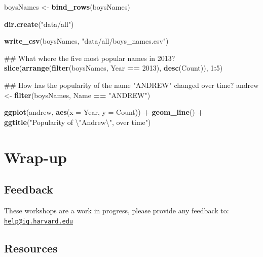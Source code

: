 \documentclass[]{book}
\newenvironment{Shaded}{\begin{snugshade}}{\end{snugshade}}
\newcommand{\KeywordTok}[1]{\textcolor[rgb]{0.13,0.29,0.53}{\textbf{#1}}}
\newcommand{\DataTypeTok}[1]{\textcolor[rgb]{0.13,0.29,0.53}{#1}}
\newcommand{\DecValTok}[1]{\textcolor[rgb]{0.00,0.00,0.81}{#1}}
\newcommand{\CharTok}[1]{\textcolor[rgb]{0.31,0.60,0.02}{#1}}
\newcommand{\StringTok}[1]{\textcolor[rgb]{0.31,0.60,0.02}{#1}}
\newcommand{\OperatorTok}[1]{\textcolor[rgb]{0.81,0.36,0.00}{\textbf{#1}}}
\newcommand{\NormalTok}[1]{#1}
\begin{document}
\begin{Shaded}
\begin{Highlighting}[]
\NormalTok{boysNames <-}\StringTok{ }\KeywordTok{bind_rows}\NormalTok{(boysNames)}

\KeywordTok{dir.create}\NormalTok{(}\StringTok{"data/all"}\NormalTok{)}

\KeywordTok{write_csv}\NormalTok{(boysNames, }\StringTok{"data/all/boys_names.csv"}\NormalTok{)}

\NormalTok{## What where the five most popular names in 2013?}
\KeywordTok{slice}\NormalTok{(}\KeywordTok{arrange}\NormalTok{(}\KeywordTok{filter}\NormalTok{(boysNames, Year }\OperatorTok{==}\StringTok{ }\DecValTok{2013}\NormalTok{),}
              \KeywordTok{desc}\NormalTok{(Count)),}
      \DecValTok{1}\OperatorTok{:}\DecValTok{5}\NormalTok{)}

\NormalTok{## How has the popularity of the name "ANDREW" changed over time?}
\NormalTok{andrew <-}\StringTok{ }\KeywordTok{filter}\NormalTok{(boysNames, Name }\OperatorTok{==}\StringTok{ "ANDREW"}\NormalTok{)}

\KeywordTok{ggplot}\NormalTok{(andrew, }\KeywordTok{aes}\NormalTok{(}\DataTypeTok{x =}\NormalTok{ Year, }\DataTypeTok{y =}\NormalTok{ Count)) }\OperatorTok{+}
\StringTok{    }\KeywordTok{geom_line}\NormalTok{() }\OperatorTok{+}
\StringTok{    }\KeywordTok{ggtitle}\NormalTok{(}\StringTok{"Popularity of }\CharTok{\textbackslash{}"}\StringTok{Andrew}\CharTok{\textbackslash{}"}\StringTok{, over time"}\NormalTok{)}
\end{Highlighting}
\end{Shaded}

\section{Wrap-up}\label{wrap-up-4}

\subsection{Feedback}\label{feedback-4}

These workshops are a work in progress, please provide any feedback to:
\href{mailto:help@iq.harvard.edu}{\nolinkurl{help@iq.harvard.edu}}

\subsection{Resources}\label{resources-4}
\end{document}

